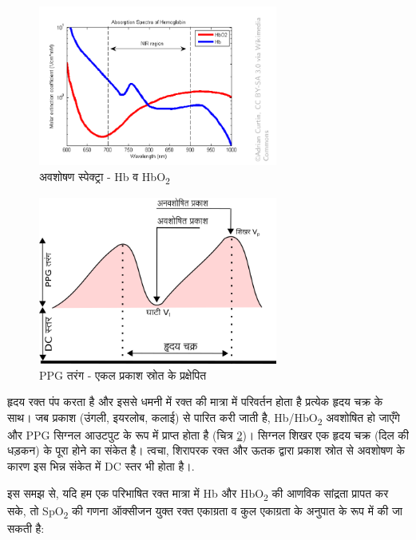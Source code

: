 	\begin{english}
	\begin{figure}[ht!]
		\centering
		\includegraphics[width=0.7\textwidth]{../common/spectra.png}
		\caption{अवशोषण स्पेक्ट्रा - Hb व HbO\textsubscript{2}}
		\label{fig:spectrum}
	\end{figure}
	\end{english}
	
	
	\begin{figure}[ht!]
		\centering
		\includegraphics[width=0.7\textwidth]{images/PPG_hi.png}
		\caption{PPG तरंग - एकल प्रकाश स्रोत के प्रक्षेपित }
		\label{fig:ppg}
	\end{figure}


	हृदय रक्त पंप करता है और इससे धमनी में रक्त की मात्रा में परिवर्तन होता है प्रत्येक हृदय चक्र के साथ। जब प्रकाश (उंगली, इयरलोब, कलाई) से पारित करी जाती है, Hb/HbO\textsubscript{2} अवशोषित हो जाएँगे और PPG सिग्नल आउटपुट के रूप में प्राप्त होता है (चित्र \ref{fig:ppg})। सिग्नल शिखर एक हृदय चक्र (दिल की धड़कन) के पूरा होने का संकेत है। त्वचा, शिरापरक रक्त और ऊतक द्वारा प्रकाश स्रोत से अवशोषण के कारण इस भिन्न संकेत में DC स्तर भी होता है।.
	
	इस समझ से, यदि हम एक परिभाषित रक्त मात्रा में Hb और HbO\textsubscript{2} की आणविक सांद्रता प्रापत कर सके, तो SpO\textsubscript{2} की गणना ऑक्सीजन युक्त रक्त एकाग्रता व कुल एकाग्रता के अनुपात के रूप में की जा सकती है:
	

